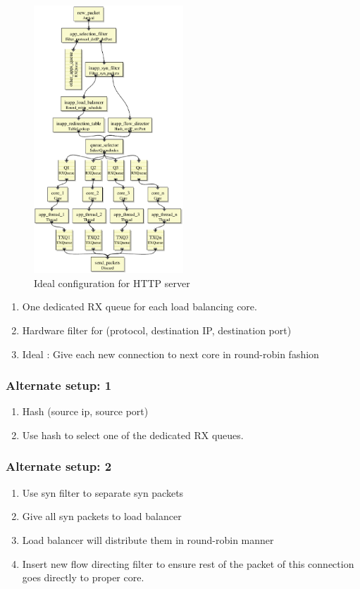 \begin{figure}[t]
\centering
\includegraphics[width=0.5\textwidth]{figures/HTTPServerIdeal.eps}
\caption{Ideal configuration for HTTP server}
\end{figure}

\begin{enumerate}
    \item One dedicated RX queue for each load balancing core.
    \item Hardware filter for (protocol, destination IP, destination port)
    \item Ideal : Give each new connection to next core in round-robin fashion
\end{enumerate}

\subsubsection{Alternate setup: 1}
\begin{enumerate}
       \item Hash (source ip, source port)
       \item Use hash to select one of the dedicated RX queues.
\end{enumerate}

\subsubsection{Alternate setup: 2}
\begin{enumerate}
       \item Use syn filter to separate syn packets
       \item Give all syn packets to load balancer
       \item Load balancer will distribute them in round-robin manner
       \item Insert new flow directing filter to ensure rest of the packet of
        this connection goes directly to proper core.
\end{enumerate}


